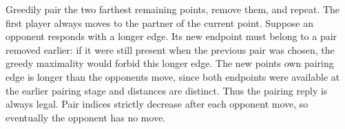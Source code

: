 Greedily pair the two farthest remaining points, remove them, and repeat. The first player always moves to the partner of the current point. Suppose an opponent responds with a longer edge. Its new endpoint must belong to a pair removed earlier: if it were still present when the previous pair was chosen, the greedy maximality would forbid this longer edge. The new point\textquotesingle s own pairing edge is longer than the opponent\textquotesingle s move, since both endpoints were available at the earlier pairing stage and distances are distinct. Thus the pairing reply is always legal. Pair indices strictly decrease after each opponent move, so eventually the opponent has no move.
